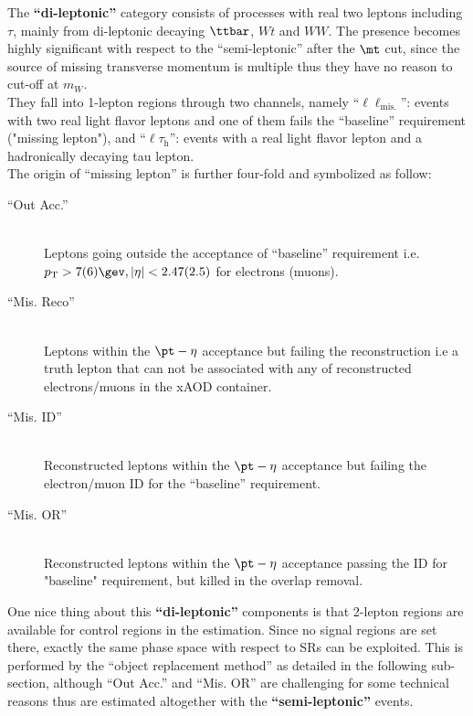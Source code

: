 The \textbf{``di-leptonic''} category consists of processes with real two leptons including $\tau$, mainly from di-leptonic decaying $\ttbar$, $Wt$ and $WW$. The presence becomes highly significant with respect to the ``semi-leptonic'' after the $\mt$ cut, since the source of missing transverse momentum is multiple thus they have no reason to cut-off at $m_{W}$.  \\
They fall into 1-lepton regions through two channels, namely ``$\ell\ell_{\mathrm{mis.}}$'': events with two real light flavor leptons and one of them fails the ``baseline'' requirement ("missing lepton"), and ``$\ell\tau_{\mathrm{h}}$'': events with a real light flavor lepton and a hadronically decaying tau lepton. \\
%
The origin of ``missing lepton'' is further four-fold and symbolized as follow: 
\begin{description}
\item [``Out Acc.''] \mbox{} \\
 Leptons going outside the acceptance of ``baseline'' requirement i.e. $p_{\mathrm{T}}>7(6)\gev, |\eta|<2.47(2.5)$ for electrons (muons).
\item [``Mis. Reco''] \mbox{} \\
 Leptons within the $\pt-\eta$ acceptance but failing the reconstruction i.e a truth lepton that can not be associated with any of reconstructed electrons/muons in the xAOD container.
\item [``Mis. ID''] \mbox{} \\
 Reconstructed leptons within the $\pt-\eta$ acceptance but failing the electron/muon ID for the ``baseline'' requirement.
\item [``Mis. OR''] \mbox{} \\
 Reconstructed leptons within the $\pt-\eta$ acceptance passing the ID for "baseline" requirement, but killed in the overlap removal. 
\end{description}

One nice thing about this \textbf{``di-leptonic''} components is that 2-lepton regions are available for control regions in the estimation. Since no signal regions are set there, exactly the same phase space with respect to SRs can be exploited. This is performed by the ``object replacement method'' as detailed in the following sub-section, although ``Out Acc.'' and ``Mis. OR'' are challenging for some technical reasons thus are estimated altogether with the  \textbf{``semi-leptonic''} events. \\
%

